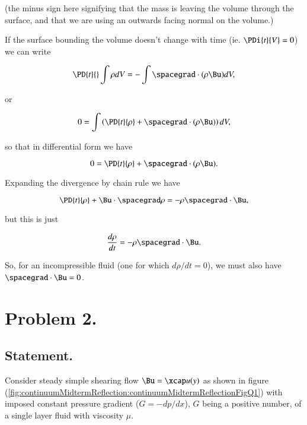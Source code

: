 \begin{itemize}
(the minus sign here signifying that the mass is leaving the volume through the surface, and that we are using an outwards facing normal on the volume.)

If the surface bounding the volume doesn't change with time (ie. $\PDi{t}{V} = 0$) we can write

\begin{equation}\label{eqn:continuumMidTermReflection:230}
\PD{t}{} \int \rho dV = -\int \spacegrad \cdot (\rho \Bu) dV,
\end{equation}

or

\begin{equation}\label{eqn:continuumMidTermReflection:250}
0 = \int \left( \PD{t}{\rho} + \spacegrad \cdot (\rho \Bu) \right) dV,
\end{equation}

so that in differential form we have

\begin{equation}\label{eqn:continuumMidTermReflection:270}
0 = \PD{t}{\rho} + \spacegrad \cdot (\rho \Bu).
\end{equation}

Expanding the divergence by chain rule we have

\begin{equation}\label{eqn:continuumMidTermReflection:290}
\PD{t}{\rho} +\Bu \cdot \spacegrad \rho = -\rho \spacegrad \cdot \Bu,
\end{equation}

but this is just

\begin{equation}\label{eqn:continuumMidTermReflection:310}
\frac{d\rho}{dt} = -\rho \spacegrad \cdot \Bu.
\end{equation}

So, for an incompressible fluid (one for which $d\rho/dt =0$), we must also have $\spacegrad \cdot \Bu = 0$.

\end{itemize}

\section{Problem 2.}
\subsection{Statement.}

Consider steady simple shearing flow $\Bu = \xcap u(y)$ as shown in figure (\ref{fig:continuumMidtermReflection:continuumMidtermReflectionFigQ1}) with imposed constant pressure gradient ($G = -dp/dx$), $G$ being a positive number, of a single layer fluid with viscosity $\mu$.

